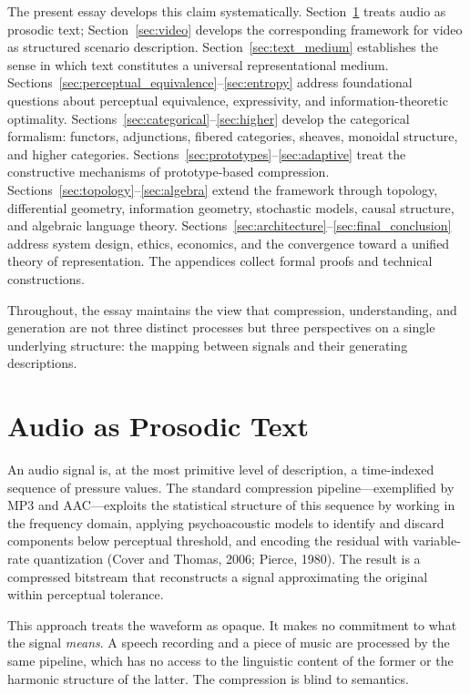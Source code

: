 \documentclass[11pt,a4paper]{article}
\theoremstyle{definition}
\theoremstyle{remark}
\begin{document}
The present essay develops this claim systematically. Section~\ref{sec:audio} treats audio as prosodic text; Section~\ref{sec:video} develops the corresponding framework for video as structured scenario description. Section~\ref{sec:text_medium} establishes the sense in which text constitutes a universal representational medium. Sections~\ref{sec:perceptual_equivalence}--\ref{sec:entropy} address foundational questions about perceptual equivalence, expressivity, and information-theoretic optimality. Sections~\ref{sec:categorical}--\ref{sec:higher} develop the categorical formalism: functors, adjunctions, fibered categories, sheaves, monoidal structure, and higher categories. Sections~\ref{sec:prototypes}--\ref{sec:adaptive} treat the constructive mechanisms of prototype-based compression. Sections~\ref{sec:topology}--\ref{sec:algebra} extend the framework through topology, differential geometry, information geometry, stochastic models, causal structure, and algebraic language theory. Sections~\ref{sec:architecture}--\ref{sec:final_conclusion} address system design, ethics, economics, and the convergence toward a unified theory of representation. The appendices collect formal proofs and technical constructions.

Throughout, the essay maintains the view that compression, understanding, and generation are not three distinct processes but three perspectives on a single underlying structure: the mapping between signals and their generating descriptions.

\section{Audio as Prosodic Text}
\label{sec:audio}

An audio signal is, at the most primitive level of description, a time-indexed sequence of pressure values. The standard compression pipeline---exemplified by MP3 and AAC---exploits the statistical structure of this sequence by working in the frequency domain, applying psychoacoustic models to identify and discard components below perceptual threshold, and encoding the residual with variable-rate quantization (Cover and Thomas, 2006; Pierce, 1980). The result is a compressed bitstream that reconstructs a signal approximating the original within perceptual tolerance.

This approach treats the waveform as opaque. It makes no commitment to what the signal \emph{means}. A speech recording and a piece of music are processed by the same pipeline, which has no access to the linguistic content of the former or the harmonic structure of the latter. The compression is blind to semantics.
\end{document}
